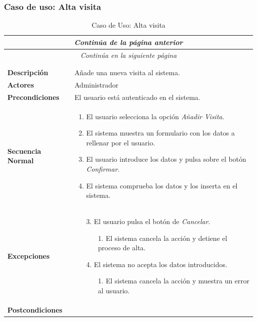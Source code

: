 \subsubsection*{Caso de uso: Alta visita }
\begin{longtable}{| p{4cm} | p{10cm} |}
\endfirsthead
\multicolumn{2}{c}{\textit{Continúa de la página anterior}}\\[12pt]
\hline
\endhead
\hline
\multicolumn{2}{c}{\textit{Continúa en la siguiente página}} \\
\endfoot
\hline
\caption{Caso de Uso: Alta visita}\label{fig:1}\\
\endlastfoot


\hline
\multicolumn{2}{|c|}{\textbf{CU$<$31$>$ - Alta Visita}} \\

\hline
\textbf{Descripción} &
Añade una nueva visita al sistema.\\

\hline
\textbf{Actores} &
Administrador\\

\hline
\textbf{Precondiciones} &
El usuario está autenticado en el sistema.\\

\hline
\textbf{Secuencia Normal} &\mbox{}\par\vspace{-\baselineskip}
\begin{enumerate}[leftmargin=0.7cm, topsep=0.1cm]
\item El usuario selecciona la opción \textit{Añadir Visita}.
\item El sistema muestra un formulario con los datos a rellenar por el usuario.
\item El usuario introduce los datos y pulsa sobre el botón \textit{Confirmar}.
\item El sistema comprueba los datos y los inserta en el sistema.
\end{enumerate}


\\
\hline
\textbf{Excepciones} &\mbox{}\par\vspace{-\baselineskip}
\begin{enumerate}[leftmargin=0.9cm, topsep=0.1cm]
\item[3.] El usuario pulsa el botón de \textit{Cancelar}.
	\begin{itemize}
	\item[1.] El sistema cancela la acción y detiene el proceso de alta.
	\end{itemize}
\item[4.] El sistema no acepta los datos introducidos.
	\begin{itemize}
	\item[1.] El sistema cancela la acción y muestra un error al usuario.
	\end{itemize}
\end{enumerate}
\\

\hline
\textbf{Postcondiciones} & \\
\hline
\end{longtable}



